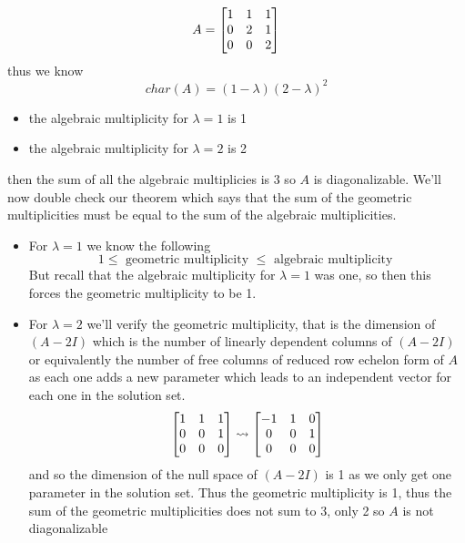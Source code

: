 \documentclass[11pt]{book}
\begin{document}
\begin{eg}
    \[
    A= \begin{bmatrix} 1 & 1 & 1 \\ 0 & 2 & 1 \\ 0 & 0 & 2 \end{bmatrix}
    \]
    thus we know 
    \[
        char\left(A\right) = \left( 1 - \lambda  \right) \left( 2 - \lambda  \right) ^2 
    \]
    \begin{itemize}
        \item the algebraic multiplicity for $\lambda = 1$ is 1
        \item the algebraic multiplicity for $\lambda = 2$ is 2
    \end{itemize}
    then the sum of all the algebraic multiplicies is $3$ so $A$ is diagonalizable. We'll now double check our theorem which says that the sum of the geometric multiplicities must be equal to the sum of the algebraic multiplicities. 
    \begin{itemize}
        \item For $\lambda = 1$ we know the following 
            \[
            1\le \text{ geometric multiplicity  } \le \text{ algebraic multiplicity  } 
            \]
            But recall that the algebraic multiplicity for $\lambda = 1$ was one, so then this forces the geometric multiplicity to be 1.
        \item For $\lambda = 2$ we'll verify the geometric multiplicity, that is the dimension of $\left( A - 2I \right) $ which is the number of linearly dependent columns  of $\left( A - 2I \right) $ or equivalently the number of free columns of reduced row echelon form of $A$ as each one adds a new parameter which leads to an independent vector for each one in the solution set. 
            \[
            \begin{bmatrix} 1 & 1 & 1 \\ 0 & 0 & 1 \\ 0 & 0 & 0 \end{bmatrix} \rightsquigarrow \begin{bmatrix} -1 & 1 & 0 \\ 0 & 0 & 1 \\ 0 & 0 & 0 \end{bmatrix}     
            \]
            and so the dimension of the null space of $\left( A - 2I \right) $ is 1 as we only get one parameter in the solution set. Thus the geometric multiplicity is 1, thus the sum of the geometric multiplicities does not sum to 3, only 2 so $A$ is not diagonalizable  
    \end{itemize}
\end{eg}
\end{document}
